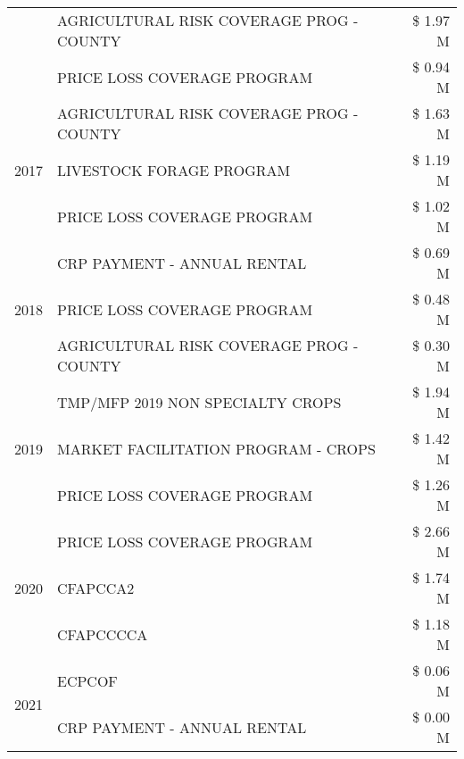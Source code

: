 \begin{tabular}{llr}
 & AGRICULTURAL RISK COVERAGE PROG - COUNTY & \$ 1.97 M \\
 & PRICE LOSS COVERAGE PROGRAM & \$ 0.94 M \\
\cline{1-3}
\multirow[t]{3}{*}{2017} & AGRICULTURAL RISK COVERAGE PROG - COUNTY & \$ 1.63 M \\
 & LIVESTOCK FORAGE PROGRAM & \$ 1.19 M \\
 & PRICE LOSS COVERAGE PROGRAM & \$ 1.02 M \\
\cline{1-3}
\multirow[t]{3}{*}{2018} & CRP PAYMENT - ANNUAL RENTAL & \$ 0.69 M \\
 & PRICE LOSS COVERAGE PROGRAM & \$ 0.48 M \\
 & AGRICULTURAL RISK COVERAGE PROG - COUNTY & \$ 0.30 M \\
\cline{1-3}
\multirow[t]{3}{*}{2019} & TMP/MFP 2019 NON SPECIALTY CROPS & \$ 1.94 M \\
 & MARKET FACILITATION PROGRAM - CROPS & \$ 1.42 M \\
 & PRICE LOSS COVERAGE PROGRAM & \$ 1.26 M \\
\cline{1-3}
\multirow[t]{3}{*}{2020} & PRICE LOSS COVERAGE PROGRAM & \$ 2.66 M \\
 & CFAPCCA2 & \$ 1.74 M \\
 & CFAPCCCCA & \$ 1.18 M \\
\cline{1-3}
\multirow[t]{2}{*}{2021} & ECPCOF & \$ 0.06 M \\
 & CRP PAYMENT - ANNUAL RENTAL & \$ 0.00 M \\
\cline{1-3}
\bottomrule
\end{tabular}
